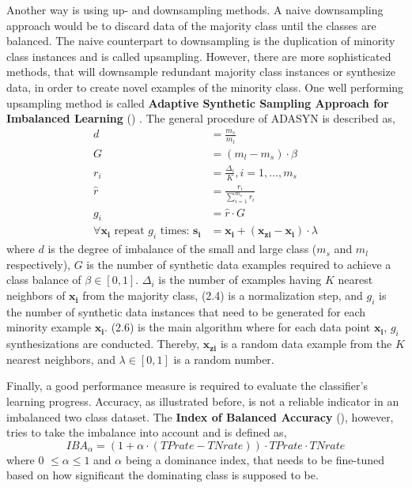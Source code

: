   Another way is using up- and downsampling methods.
  A naive downsampling approach would be to discard data of the majority class until the classes are balanced.
  The naive counterpart to downsampling is the duplication of minority class instances and is called upsampling.
  However, there are more sophisticated methods, that will downsample redundant majority class instances or synthesize data, in order to create novel examples of the minority class.
  One well performing upsampling method is called \textbf{Adaptive Synthetic Sampling Approach for Imbalanced Learning} () \citep{He2008}.
  The general procedure of ADASYN is described as,
  \begin{align}
    d &= \frac{m_s}{m_l} \\
    G &= (m_l - m_s) \cdot \beta \\
    r_i &= \frac{\Delta_i}{K}, i=1, \dots, m_s \\
    \hat{r} &= \frac{r_i}{\sum_{i=1}^{m_s} r_i } \\
    g_i &= \hat{r} \cdot G \\
    \forall \boldsymbol{x_i} \text{ repeat } g_i \text{ times: } \boldsymbol{s_i} &= \boldsymbol{x_i} + (\boldsymbol{x_{zi}} - \boldsymbol{x_i}) \cdot \lambda
  \end{align}
  where $d$ is the degree of imbalance of the small and large class ($m_s$ and $m_l$ respectively), $G$ is the number of synthetic data examples required to achieve a class balance of $\beta \in [0,1]$.
  $\Delta_i$ is the number of examples having $K$ nearest neighbors of $\boldsymbol{x_i}$ from the majority class, (2.4) is a normalization step, and $g_i$ is the number of synthetic data instances that need to be generated for each minority example $\boldsymbol{x_i}$.
  (2.6) is the main algorithm where for each data point $\boldsymbol{x_i}$, $g_i$ synthesizations are conducted.
  Thereby, $\boldsymbol{x_{zi}}$ is a random data example from the $K$ nearest neighbors, and $\lambda \in [0,1]$ is a random number.

  Finally, a good performance measure is required to evaluate the classifier's learning progress.
  Accuracy, as illustrated before, is not a reliable indicator in an imbalanced two class dataset.
  The \textbf{Index of Balanced Accuracy} (), however, tries to take the imbalance into account and is defined as, \[IBA_{\alpha} = (1 + \alpha \cdot (TPrate - TNrate)) \cdot TPrate \cdot TNrate \] where 0 $\leq \alpha \leq 1$ and $\alpha$ being a dominance index, that needs to be fine-tuned based on how significant the dominating class is supposed to be.

